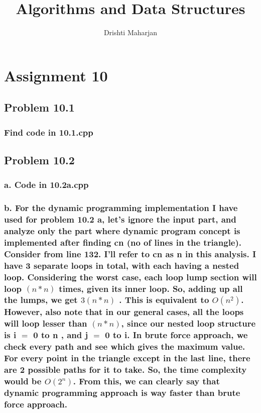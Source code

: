 \documentclass[a4paper,12pt]{article}
\begin{document}
\title{Algorithms and Data Structures }
\author{Drishti Maharjan}
\maketitle

\section*{\center Assignment 10}

\subsection*{\newpage Problem 10.1 \newline}
\subsubsection*{\textnormal {Find code in 10.1.cpp \newline }}

\subsection*{ Problem 10.2 \newline}
\subsubsection*{\textnormal {a. Code in 10.2a.cpp \newline
} }

\subsubsection*{\textnormal {b. For the dynamic programming implementation I have used for problem 10.2 a, let's ignore the input part, and analyze only the part where dynamic program concept is implemented after finding cn (no of lines in the triangle). Consider from line 132.
I'll refer to cn as n in this analysis. I have 3 separate loops in total, with each having a nested loop. Considering the worst case, each loop lump section will loop $ (n*n) $ times, given its inner loop. So, adding up all the lumps, we get $ 3 (n*n) $ . This is equivalent to $ O(n^2) $. However, also note that in our general cases, all the loops will loop lesser than $(n*n)$, since our nested loop structure is i $ = $ 0 to n , and j $ = $ 0 to i.
\newline \newline
In brute force approach, we check every path and see which gives the maximum value. For every point in the triangle except in the last line, there are 2 possible paths for it to take. So, the time complexity would be $ O(2 ^ n)$. From this, we can clearly say that dynamic programming approach is way faster than brute force approach.
}} 
\end{document}
